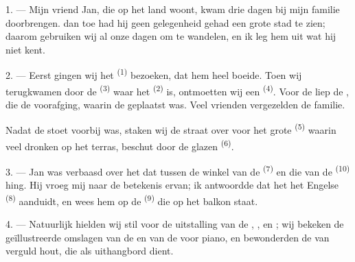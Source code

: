 
\VUsaut{4.0mm}
\VUsaut{3.0mm}

\VUsaut{3.0mm}

1. --- Mijn vriend Jan, die op het land woont, kwam drie dagen bij mijn familie doorbrengen.
 dan toe had hij geen gelegenheid gehad een grote stad te zien; daarom gebruiken
wij al onze dagen om te wandelen, en ik leg hem uit wat hij niet kent.

2. --- Eerst gingen wij het  \textsuperscript{(1)} bezoeken, dat hem
heel boeide. Toen wij terugkwamen door de  \textsuperscript{(3)} waar het
 \textsuperscript{(2)} is, ontmoetten wij een 
\textsuperscript{(4)}. Voor de
 liep de , die de 
voorafging, waarin de  geplaatst was. Veel vrienden vergezelden de
 familie.

Nadat de stoet voorbij was, staken wij de straat over voor het grote
 \textsuperscript{(5)} waarin veel 
 dronken op het terras, beschut door de glazen 
\textsuperscript{(6)}.

3. --- Jan was verbaasd over het  dat tussen de winkel van de
 \textsuperscript{(7)} en die van de 
\textsuperscript{(10)} hing. Hij vroeg mij naar de betekenis ervan; ik antwoordde dat het het
Engelse  \textsuperscript{(8)} aanduidt, en wees hem op de 
\textsuperscript{(9)} die op het balkon staat.

\VUsaut{3.0mm}

4. --- Natuurlijk hielden wij stil voor de uitstalling van de
, ,  en
; wij bekeken de geïllustreerde omslagen van de
 en van de  voor piano, en bewonderden
de  van verguld hout, die als uithangbord dient.

